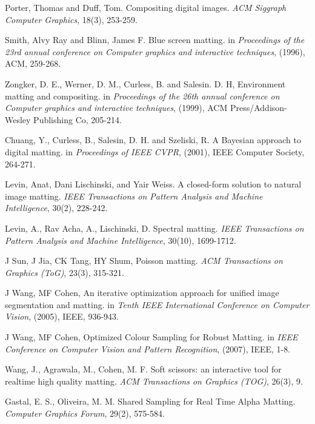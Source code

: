 \documentclass[a4paper,11pt]{report}
\begin{document}
 
\begin{thebibliography}{100}  %

 Porter, Thomas and Duff, Tom. Compositing digital images. \textit{ACM Siggraph Computer Graphics}, 18(3), 253-259.

 Smith, Alvy Ray and Blinn, James F. Blue screen matting. in \textit{Proceedings of the 23rd annual conference on Computer graphics and interactive techniques}, (1996), ACM, 259-268.

 Zongker, D. E., Werner, D. M., Curless, B. and Salesin. D. H, Environment matting and compositing. in \textit{Proceedings of the 26th annual conference on Computer graphics and interactive techniques}, (1999), ACM Press/Addison-Wesley Publishing Co, 205-214.

 Chuang, Y., Curless, B., Salesin, D. H. and Szeliski, R. A Bayesian approach to digital matting. in \textit{Proceedings of IEEE CVPR}, (2001), IEEE Computer Society, 264-271.

 Levin, Anat, Dani Lischinski, and Yair Weiss. A closed-form solution to natural image matting. \textit{IEEE Transactions on Pattern Analysis and Machine Intelligence}, 30(2), 228-242.

 Levin, A., Rav Acha, A., Lischinski, D. Spectral matting. \textit{IEEE Transactions on Pattern Analysis and Machine Intelligence}, 30(10), 1699-1712.

 J Sun, J Jia, CK Tang, HY Shum, Poisson matting. \textit{ACM Transactions on Graphics (ToG)}, 23(3), 315-321.

 J Wang, MF Cohen, An iterative optimization approach for unified image segmentation and matting. in \textit{Tenth IEEE International Conference on Computer Vision}, (2005), IEEE, 936-943.

 J Wang, MF Cohen, Optimized Colour Sampling for Robust Matting. in \textit{IEEE Conference on Computer Vision and Pattern Recognition}, (2007), IEEE, 1-8.

 Wang, J., Agrawala, M., Cohen, M. F. Soft scissors: an interactive tool for realtime high quality matting. \textit{ACM Transactions on Graphics (TOG)}, 26(3), 9.

 Gastal, E. S., Oliveira, M. M. Shared Sampling for Real Time Alpha Matting. \textit{Computer Graphics Forum}, 29(2), 575-584.


\end{thebibliography}
\end{document}
